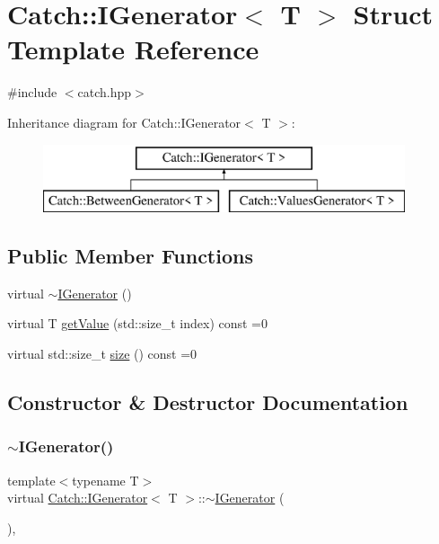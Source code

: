 \hypertarget{struct_catch_1_1_i_generator}{}\section{Catch\+:\+:I\+Generator$<$ T $>$ Struct Template Reference}
\label{struct_catch_1_1_i_generator}


{\ttfamily \#include $<$catch.\+hpp$>$}

Inheritance diagram for Catch\+:\+:I\+Generator$<$ T $>$\+:\begin{figure}[H]
\begin{center}
\leavevmode
\includegraphics[height=2.000000cm]{struct_catch_1_1_i_generator}
\end{center}
\end{figure}
\subsection*{Public Member Functions}
\begin{DoxyCompactItemize}
\item 
virtual \mbox{\hyperlink{struct_catch_1_1_i_generator_a0622037f4617e09aa8c584b0144d4a1a}{$\sim$\+I\+Generator}} ()
\item 
virtual T \mbox{\hyperlink{struct_catch_1_1_i_generator_ad69e937cb66dba3ed9429c42abf4fce3}{get\+Value}} (std\+::size\+\_\+t index) const =0
\item 
virtual std\+::size\+\_\+t \mbox{\hyperlink{struct_catch_1_1_i_generator_a2e317253b03e838b6065ce69719a198e}{size}} () const =0
\end{DoxyCompactItemize}


\subsection{Constructor \& Destructor Documentation}
\mbox{\label{struct_catch_1_1_i_generator_a0622037f4617e09aa8c584b0144d4a1a}} 
\subsubsection{\texorpdfstring{$\sim$\+I\+Generator()}{~IGenerator()}}
{\footnotesize\ttfamily template$<$typename T$>$ \\
virtual \mbox{\hyperlink{struct_catch_1_1_i_generator}{Catch\+::\+I\+Generator}}$<$ T $>$\+::$\sim$\mbox{\hyperlink{struct_catch_1_1_i_generator}{I\+Generator}} (\begin{DoxyParamCaption}{ }\end{DoxyParamCaption})\hspace{0.3cm}{\ttfamily [inline]}, {\ttfamily [virtual]}}



